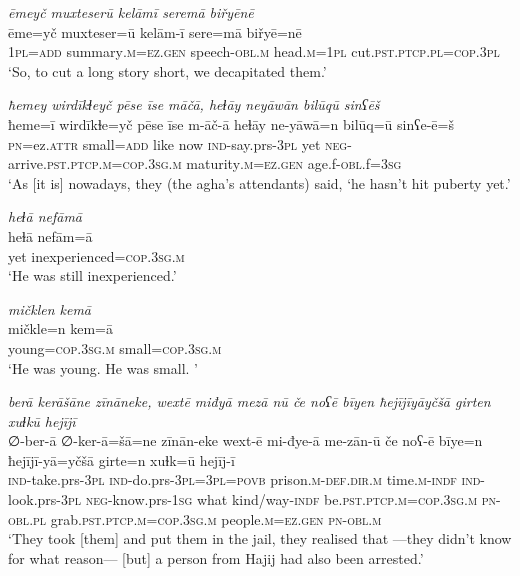 \ea \label{BP.127}
\textit{ēmeyč muxteserū kelāmī seremā biřyēnē} \\ 
\gll ēme=yč muxteser=ū kelām-ī sere=mā biřyē=nē \\ 
 \textsc{1pl}\textsc{=add} summary\textsc{.m}\textsc{=ez.gen} speech\textsc{-obl}\textsc{.m} head\textsc{.m}\textsc{=\textsc{1pl}} cut\textsc{.pst}\textsc{.ptcp}\textsc{.pl}\textsc{=cop}\textsc{.3pl} \\ 
\glt `So, to cut a long story short, we decapitated them.'
\z 
 
\ea \label{BP.132}
\textit{ħemey wirdīkɫeyč pēse īse māčā, heɫāy neyāwān bilūqū sinʕēš} \\ 
\gll ħeme=ī wirdīkɫe=yč pēse īse m-āč-ā heɫāy ne-yāwā=n bilūq=ū sinʕe-ē=š \\ 
 \textsc{pn}=ez.\textsc{attr} small\textsc{=add} like now \textsc{ind-}say.prs\textsc{-3pl} yet \textsc{neg-}arrive\textsc{.pst}\textsc{.ptcp}\textsc{.m}\textsc{=cop}\textsc{.3sg}\textsc{.m} maturity\textsc{.m}\textsc{=ez.gen} age.f\textsc{-obl}.f\textsc{=3sg} \\ 
\glt `As [it is] nowadays, they (the agha’s attendants) said, ‘he hasn’t hit puberty yet.'
\z 
 
\ea \label{BP.135}
\textit{heɫā nefāmā} \\ 
\gll heɫā nefām=ā \\ 
 yet inexperienced\textsc{=cop}\textsc{.3sg}\textsc{.m} \\ 
\glt `He was still inexperienced.'
\z 
 
\ea \label{BP.136}
\textit{mičklen kemā} \\ 
\gll mičkle=n kem=ā \\ 
 young\textsc{=cop}\textsc{.3sg}\textsc{.m} small\textsc{=cop}\textsc{.3sg}\textsc{.m} \\ 
\glt `He was young. He was small. '
\z 
 
\ea \label{BP.139}
\textit{berā kerāšāne zīnāneke, wextē miđyā mezā nū če noʕē bīyen ħejījīyāyčšā girten xuɫkū hejījī} \\ 
\gll ∅-ber-ā ∅-ker-ā=šā=ne zīnān-eke wext-ē mi-đye-ā me-zān-ū če noʕ-ē bīye=n ħejījī-yā=yčšā girte=n xuɫk=ū hejīj-ī \\ 
 \textsc{ind-}take.prs\textsc{-3pl} \textsc{ind-}do.prs\textsc{-3pl}\textsc{=3pl}\textsc{=\textsc{povb}} prison\textsc{.m}\textsc{-def}\textsc{.dir}\textsc{.m} time\textsc{.m}\textsc{-indf} \textsc{ind-}look.prs\textsc{-3pl} \textsc{neg-}know.prs\textsc{-\textsc{1sg}} what kind/way\textsc{-indf} be\textsc{.pst}\textsc{.ptcp}\textsc{.m}\textsc{=cop}\textsc{.3sg}\textsc{.m} \textsc{pn}\textsc{-obl}\textsc{.pl} grab\textsc{.pst}\textsc{.ptcp}\textsc{.m}\textsc{=cop}\textsc{.3sg}\textsc{.m} people\textsc{.m}\textsc{=ez.gen} \textsc{pn}\textsc{-obl}\textsc{.m} \\ 
\glt `They took [them] and put them in the jail, they realised that —they didn’t know for what reason— [but] a person from Hajij had also been arrested.'
\z 
 

